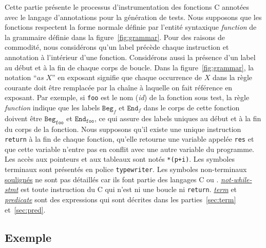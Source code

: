 Cette partie présente le processus d'instrumentation des fonctions C annotées
avec le langage d'annotations \eacsl pour la génération de tests.
Nous supposons que les fonctions respectent la forme normale définie par
l'entité syntaxique \textit{function} de la grammaire définie dans la
figure~\ref{fig:grammar}.
Pour des raisons de commodité, nous considérons qu'un label précède chaque
instruction et annotation à l'intérieur d'une fonction.
Considérons aussi la présence d'un label au début et à la fin de chaque corps de
boucle.
Dans la figure~\ref{fig:grammar}, la notation ``${\textit{as}\;X}$'' en exposant
signifie que chaque occurrence de $X$ dans la règle courante doit être remplacée
par la chaîne à laquelle on fait référence en exposant.
Par exemple, si \texttt{foo} est le nom (\textit{id}) de la fonction sous test,
la règle \textit{function} indique que les labels $\texttt{Beg}_f$ et
$\texttt{End}_f$ dans le corps de cette fonction doivent être
$\texttt{Beg}_{\texttt{foo}}$ et $\texttt{End}_{\texttt{foo}}$, ce qui assure des
labels uniques au début et à la fin du corps de la fonction.
Nous supposons qu'il existe une unique instruction \lstinline'return' à la fin
de chaque fonction, qu'elle retourne une variable appelée \lstinline'res' et que
cette variable n'entre pas en conflit avec une autre variable du programme.
Les accès aux pointeurs et aux tableaux sont notés \lstinline|*(p+i)|.
Les symboles terminaux sont présentés en police \lstinline{typewriter}.
Les symboles non-terminaux \underline{soulignés} ne sont pas détaillés car ils
font partie des langages C ou \eacsl.
\textit{\underline{not-while-stmt}} est toute instruction du C qui n'est ni
une boucle ni \lstinline'return'.
\textit{\underline{term}} et \textit{\underline{predicate}} sont des expressions
\eacsl qui sont décrites dans les parties~\ref{sec:term} et~\ref{sec:pred}.


\subsection{Exemple}
\label{sec:translation-example}




